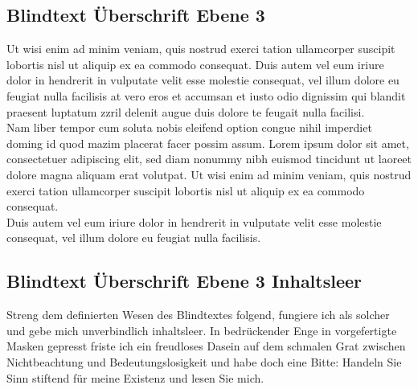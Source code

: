 \documentclass[
	english,
	ruledheaders=section,%
	class=report,%
	thesis={type=bachelor},%
	accentcolor=1b,%
	custommargins=true,%
	marginpar=false,%
	parskip=half-,%
	fontsize=11pt,%
	DIV=14,
]{tudapub}
\begin{document}
\subsection{Blindtext Überschrift Ebene 3}
Ut wisi enim ad minim veniam, quis nostrud exerci tation ullamcorper suscipit lobortis nisl ut aliquip ex ea commodo consequat. Duis autem vel eum iriure dolor in hendrerit in vulputate velit esse molestie consequat, vel illum dolore eu feugiat nulla facilisis at vero eros et accumsan et iusto odio dignissim qui blandit praesent luptatum zzril delenit augue duis dolore te feugait nulla facilisi.\\
Nam liber tempor cum soluta nobis eleifend option congue nihil imperdiet doming id quod mazim placerat facer possim assum. Lorem ipsum dolor sit amet, consectetuer adipiscing elit, sed diam nonummy nibh euismod tincidunt ut laoreet dolore magna aliquam erat volutpat. Ut wisi enim ad minim veniam, quis nostrud exerci tation ullamcorper suscipit lobortis nisl ut aliquip ex ea commodo consequat.\\
Duis autem vel eum iriure dolor in hendrerit in vulputate velit esse molestie consequat, vel illum dolore eu feugiat nulla facilisis.
\subsection{Blindtext Überschrift Ebene 3 Inhaltsleer}
Streng dem definierten Wesen des Blindtextes folgend, fungiere ich als solcher und gebe mich unverbindlich inhaltsleer. In bedrückender Enge in vorgefertigte Masken gepresst friste ich ein freudloses Dasein auf dem schmalen Grat zwischen Nichtbeachtung und Bedeutungslosigkeit und habe doch eine Bitte: Handeln Sie Sinn stiftend für meine Existenz und lesen Sie mich.
\end{document}
